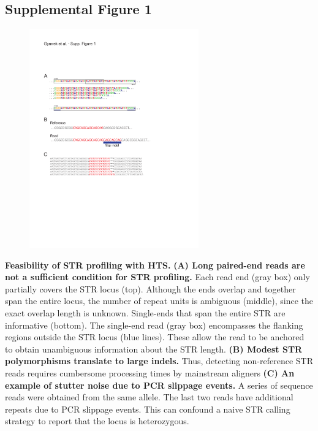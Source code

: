 \subsection{Supplemental Figure 1}
\begin{figure}[h!]
\centering
\label{fig:lobsup1}
\includegraphics[width=0.65\textwidth]{Figures/Chapter2/SuppFig1.pdf}
\end{figure}
\textbf{Feasibility of STR profiling with HTS.} \textbf{(A) Long paired-end reads are not a sufficient condition for STR profiling.} Each read end (gray box) only partially covers the STR locus (top). Although the ends overlap and together span the entire locus, the number of repeat units is ambiguous (middle), since the exact overlap length is unknown. Single-ends that span the entire STR are informative (bottom). The single-end read (gray box) encompasses the flanking regions outside the STR locus (blue lines). These allow the read to be anchored to obtain unambiguous information about the STR length. \textbf{(B) Modest STR polymorphisms translate to large indels.} Thus, detecting non-reference STR reads requires cumbersome processing times by mainstream aligners \textbf{(C) An example of stutter noise due to PCR slippage events.} A series of sequence reads were obtained from the same allele. The last two reads have additional repeats due to PCR slippage events. This can confound a naive STR calling strategy to report that the locus is heterozygous.

\pagebreak
